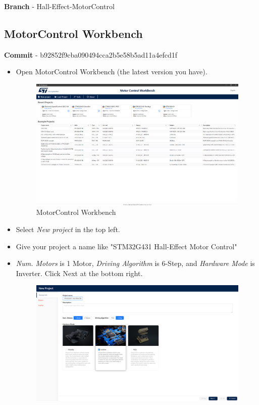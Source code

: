 \documentclass[10pt]{article}
\begin{document}
            \textbf{Branch} - Hall-Effect-MotorControl
		\FloatBarrier \subsection{MotorControl Workbench}
        \textbf{Commit} - b92852f9cba090494cca2b5e58b5ad11a4efcd1f \\
            \begin{itemize}
                \item Open MotorControl Workbench (the latest version you have). 
                    \begin{figure}[H]
                        \centerline{\includegraphics[width=\textwidth]{References/MC Workbench.png}}
                        \caption{MotorControl Workbench}
                    \end{figure}
                \item Select \emph{New project} in the top left.
                \item Give your project a name like "STM32G431 Hall-Effect Motor Control"
                \item \emph{Num. Motors} is 1 Motor, \emph{Driving Algorithm} is 6-Step, and \emph{Hardware Mode} is Inverter. Click Next at the bottom right.
                    \begin{figure}[H]
                        \centerline{\includegraphics[width=\textwidth]{References/MCW Hall-Effect New Project.png}}

\end{figure}
\end{itemize}
\end{document}

